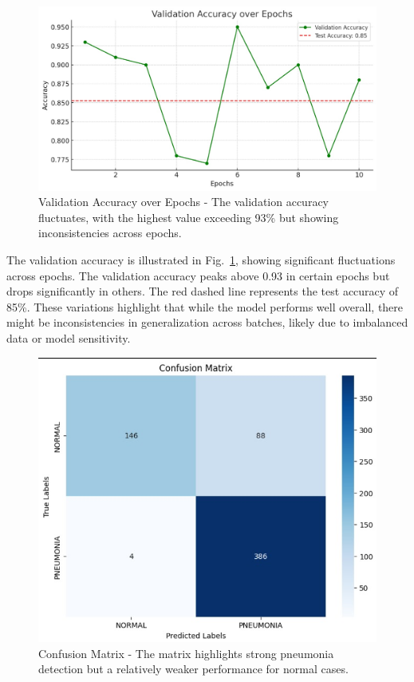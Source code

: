 \documentclass[
  twocolumn,
  10pt,
  a4paper,
  journal
]{IEEEtran}
\begin{document}
\begin{figure}[!t]
\centering
\includegraphics[width=\columnwidth]{figures/figure5.jpeg}
\caption{Validation Accuracy over Epochs - The validation accuracy fluctuates, with the highest value exceeding 93\% but showing inconsistencies across epochs.}
\label{fig:validation_accuracy}
\end{figure}

The validation accuracy is illustrated in Fig.~\ref{fig:validation_accuracy}, showing significant fluctuations across epochs. The validation accuracy peaks above 0.93 in certain epochs but drops significantly in others. The red dashed line represents the test accuracy of 85\%. These variations highlight that while the model performs well overall, there might be inconsistencies in generalization across batches, likely due to imbalanced data or model sensitivity.

\begin{figure}[!t]
\centering
\includegraphics[width=0.9\columnwidth]{figures/figure6.jpeg}
\caption{Confusion Matrix - The matrix highlights strong pneumonia detection but a relatively weaker performance for normal cases.}
\label{fig:confusion_matrix}
\end{figure}
\end{document}
